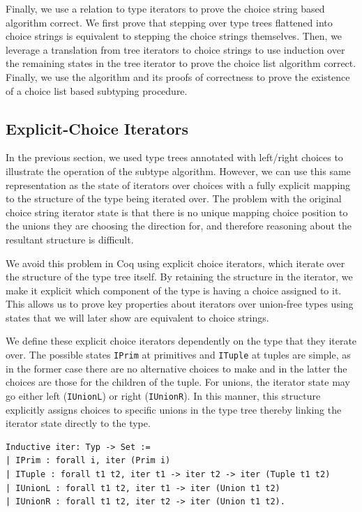 \documentclass[a4paper,english]{lipics-v2019}
\begin{document}
Finally, we use a relation to type iterators to prove the choice string based
algorithm correct. We first prove that stepping over type trees flattened into
choice strings is equivalent to stepping the choice strings themselves. Then,
we  leverage a translation from tree iterators to choice strings to use
induction over the remaining states in the tree iterator to prove the choice
list algorithm correct. Finally, we use the algorithm and its proofs of
correctness to prove the existence of a choice list based subtyping procedure.

\subsection{Explicit-Choice Iterators}

In the previous section, we used type trees annotated with left/right choices
to illustrate the operation of the subtype algorithm. However, we can use this
same representation as the state of iterators over choices with a fully explicit mapping
to the structure of the type being iterated over. The problem with the original 
choice string iterator state is that there is no unique mapping choice position to the
unions they are choosing the direction for, and therefore reasoning about the resultant
structure is difficult.

We avoid this problem in Coq using explicit choice iterators, which iterate
over the structure of the type tree itself. By retaining the structure in the
iterator, we make it explicit which component of the type is having a choice
assigned to it. This allows us to prove key properties about iterators over
union-free types using states that we will later show are equivalent to choice
strings.

We define these explicit choice iterators dependently on the type that they
iterate over. The possible states \verb|IPrim| at primitives and \verb|ITuple|
at tuples are simple, as in the former case there are no alternative choices
to make and in the latter the choices are those for the children of the tuple.
For unions, the iterator state  may go either left (\verb|IUnionL|) or right
(\verb|IUnionR|). In this manner, this structure explicitly assigns choices to
specific unions in the type tree thereby linking the iterator state directly
to the type.

\begin{small}\begin{verbatim}
Inductive iter: Typ -> Set :=
| IPrim : forall i, iter (Prim i)
| ITuple : forall t1 t2, iter t1 -> iter t2 -> iter (Tuple t1 t2)
| IUnionL : forall t1 t2, iter t1 -> iter (Union t1 t2)
| IUnionR : forall t1 t2, iter t2 -> iter (Union t1 t2).
\end{verbatim}\end{small}
\end{document}
